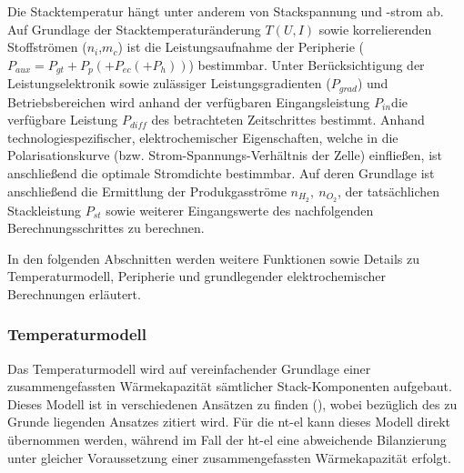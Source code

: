 \documentclass[onecolumn,10pt,titlepage]{article}
\begin{document}
Die Stacktemperatur hängt unter anderem von Stackspannung und -strom ab.
Auf Grundlage der Stacktemperaturänderung $T(U,I)$ sowie korrelierenden Stoffströmen ($n_{i}$,$m_c$) ist die Leistungsaufnahme der Peripherie ($P_{aux} = P_{gt}+P_{p}(+P_{ec}(+P_{h}))$) bestimmbar. Unter Berücksichtigung der Leistungselektronik sowie zulässiger Leistungsgradienten ($P_{grad}$) und Betriebsbereichen wird anhand der verfügbaren Eingangsleistung $P_{in}$die verfügbare Leistung $P_{diff}$  des betrachteten Zeitschrittes bestimmt. Anhand technologiespezifischer, elektrochemischer Eigenschaften, welche in die Polarisationskurve (bzw. Strom-Spannungs-Verhältnis der Zelle) einfließen, ist anschließend die optimale Stromdichte bestimmbar. Auf deren Grundlage ist anschließend die Ermittlung der Produkgasströme $n_{H_2}, ~n_{O_2}$, der tatsächlichen Stackleistung $P_{st}$ sowie weiterer Eingangswerte des nachfolgenden Berechnungsschrittes zu berechnen.

In den folgenden Abschnitten werden weitere Funktionen sowie Details zu Temperaturmodell, Peripherie und grundlegender elektrochemischer Berechnungen erläutert.


%
%


 \subsubsection{Temperaturmodell}
 \label{subsubs_mod_TEmp}
Das Temperaturmodell wird auf vereinfachender Grundlage einer zusammengefassten Wärmekapazität sämtlicher Stack-Komponenten aufgebaut. Dieses Modell ist in verschiedenen Ansätzen zu finden (\cite{Espinosa-Lopez2018,Gabrielli2016}), wobei bezüglich des zu Grunde liegenden Ansatzes \cite{Ulleberg2003} zitiert wird. Für die \gls{nt}-\gls{el} kann dieses Modell direkt übernommen werden, während im Fall der \gls{ht}-\gls{el} eine abweichende Bilanzierung unter gleicher Voraussetzung einer zusammengefassten Wärmekapazität erfolgt.\\
\end{document}

